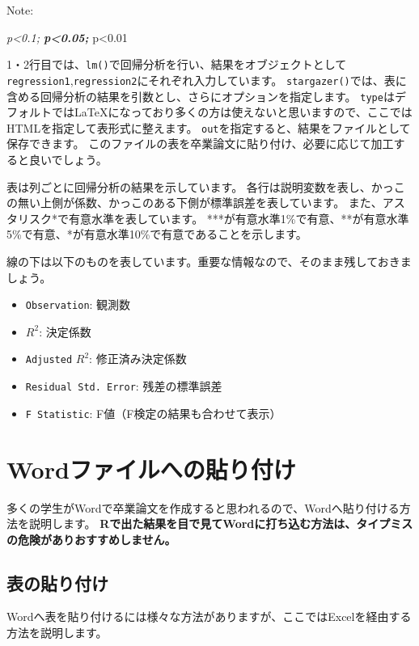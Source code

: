 \documentclass[]{book}
\providecommand{\tightlist}{%
  \setlength{\itemsep}{0pt}\setlength{\parskip}{0pt}}
\begin{document}
Note:

\emph{p\textless{}0.1; \textbf{p\textless{}0.05; }}p\textless{}0.01

1・2行目では、\texttt{lm()}で回帰分析を行い、結果をオブジェクトとして\texttt{regression1},\texttt{regression2}にそれぞれ入力しています。
\texttt{stargazer()}では、表に含める回帰分析の結果を引数とし、さらにオプションを指定します。
\texttt{type}はデフォルトではLaTeXになっており多くの方は使えないと思いますので、ここではHTMLを指定して表形式に整えます。
\texttt{out}を指定すると、結果をファイルとして保存できます。
このファイルの表を卒業論文に貼り付け、必要に応じて加工すると良いでしょう。

表は列ごとに回帰分析の結果を示しています。
各行は説明変数を表し、かっこの無い上側が係数、かっこのある下側が標準誤差を表しています。
また、アスタリスク*で有意水準を表しています。
***が有意水準1\%で有意、**が有意水準5\%で有意、*が有意水準10\%で有意であることを示します。

線の下は以下のものを表しています。重要な情報なので、そのまま残しておきましょう。

\begin{itemize}
\tightlist
\item
  \texttt{Observation}: 観測数
\item
  \(R^2\): 決定係数
\item
  \texttt{Adjusted} \(R^2\): 修正済み決定係数
\item
  \texttt{Residual\ Std.\ Error}: 残差の標準誤差
\item
  \texttt{F\ Statistic}: F値（F検定の結果も合わせて表示）
\end{itemize}

\chapter{Wordファイルへの貼り付け}\label{Word}

多くの学生がWordで卒業論文を作成すると思われるので、Wordへ貼り付ける方法を説明します。
\textbf{Rで出た結果を目で見てWordに打ち込む方法は、タイプミスの危険がありおすすめしません。}

\section{表の貼り付け}\label{ux8868ux306eux8cbcux308aux4ed8ux3051}

Wordへ表を貼り付けるには様々な方法がありますが、ここではExcelを経由する方法を説明します。
\end{document}
